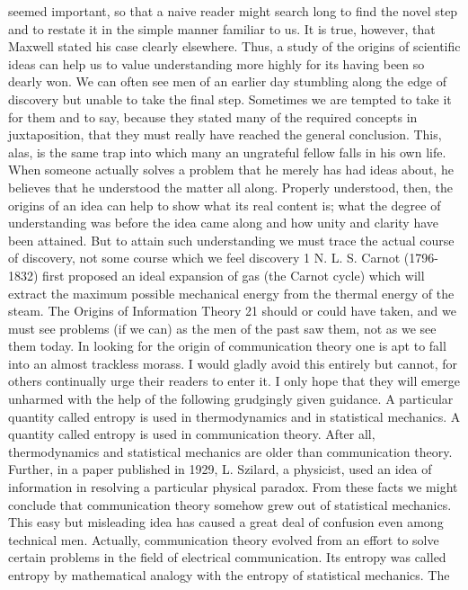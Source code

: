 seemed important, so that a naive reader might search long to find
the novel step and to restate it in the simple manner familiar to us.
It is true, however, that Maxwell stated his case clearly elsewhere.
Thus, a study of the origins of scientific ideas can help us to value
understanding more highly for its having been so dearly won. We
can often see men of an earlier day stumbling along the edge of
discovery but unable to take the final step. Sometimes we are
tempted to take it for them and to say, because they stated many
of the required concepts in juxtaposition, that they must really have
reached the general conclusion. This, alas, is the same trap into
which many an ungrateful fellow falls in his own life. When someone
actually solves a problem that he merely has had ideas about,
he believes that he understood the matter all along.
Properly understood, then, the origins of an idea can help to
show what its real content is; what the degree of understanding
was before the idea came along and how unity and clarity have
been attained. But to attain such understanding we must trace the
actual course of discovery, not some course which we feel discovery
1 N. L. S. Carnot (1796-1832) first proposed an ideal expansion of gas (the Carnot
cycle) which will extract the maximum possible mechanical energy from the thermal
energy of the steam.
The
Origins of Information Theory
21
should or could have taken, and we must see problems (if we can)
as the men of the past saw them, not as we see them today.
In looking for the origin of communication theory one is apt to
fall into an almost trackless morass. I would gladly avoid this
entirely but cannot, for others continually urge their readers to
enter it. I only hope that they will emerge unharmed with the help
of the following grudgingly given guidance.
A particular quantity called entropy is used in thermodynamics
and in statistical mechanics. A quantity called entropy is used in
communication theory. After all, thermodynamics and statistical
mechanics are older than communication theory. Further, in a
paper published in 1929, L. Szilard, a physicist, used an idea of
information in resolving a particular physical paradox. From these
facts we might conclude that communication theory somehow grew
out of statistical mechanics.
This easy but misleading idea has caused a great deal of confusion
even among technical men. Actually, communication theory
evolved from an effort to solve certain problems in the field of
electrical communication. Its entropy was called entropy by mathematical
analogy with the entropy of statistical mechanics. The
